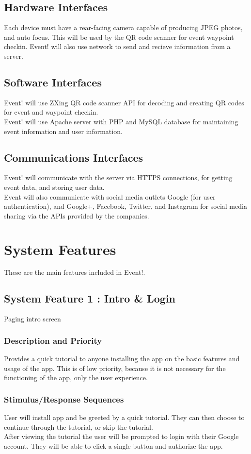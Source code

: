 \documentclass{scrreprt}
\begin{document}
\section{Hardware Interfaces}
Each device must have a rear-facing camera capable of producing JPEG photos, 
and auto focus. This will be used by the QR code scanner for event waypoint checkin.
Event! will also use network to send and recieve information from a server.

\section{Software Interfaces}
Event! will use ZXing QR code scanner API for decoding and creating QR codes for 
event and waypoint checkin. \\
Event! will use Apache server with PHP and MySQL database for maintaining event 
information and user information.

\section{Communications Interfaces}
Event! will communicate with the server via HTTPS connections, for getting event 
data, and storing user data. \\
Event will also communicate with social media outlets Google (for user authentication), 
and Google+, Facebook, Twitter, and Instagram for social media sharing via the 
APIs provided by the companies.

\chapter{System Features}
These are the main features included in Event!.

\section{System Feature 1 : Intro \& Login}
Paging intro screen

\subsection{Description and Priority}
Provides a quick tutorial to anyone installing the app on the basic features and 
usage of the app. This is of low priority, because it is not necessary for the functioning 
of the app, only the user experience.

\subsection{Stimulus/Response Sequences}
User will install app and be greeted by a quick tutorial. They can then choose to 
continue through the tutorial, or skip the tutorial. \\
After viewing the tutorial the user will be prompted to login with their Google account.
They will be able to click a single button and authorize the app.
\end{document}
